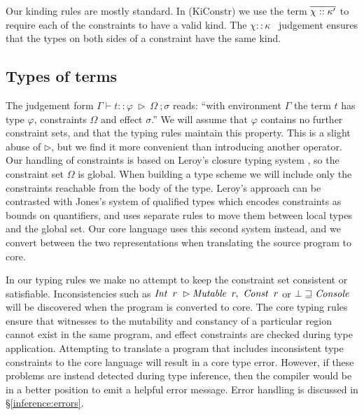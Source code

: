 \bigskip
{}

\clearpage{}
Our kinding rules are mostly standard. In (KiConstr) we use the term $\overline{\chi :: \kappa'}$ to require each of the constraints to have a valid kind. The $\chi :: \kappa$ \ judgement ensures that the types on both sides of a constraint have the same kind.


\subsection{Types of terms}
\begin{center}
\end{center}


The judgement form $\Gamma \vdash t :: \varphi \ \rhd \ \Omega \ ; \sigma$ reads: ``with environment $\Gamma$ the term $t$ has type $\varphi$, constraints $\Omega$ and effect $\sigma$.'' We will assume that $\varphi$ contains no further constraint sets, and that the typing rules maintain this property. This is a slight abuse of $\rhd$, but we find it more convenient than introducing another operator. Our handling of constraints is based on Leroy's closure typing system \cite{leroy:polymorphic-type-inference}, so the constraint set $\Omega$ is global. When building a type scheme we will include only the constraints reachable from the body of the type. Leroy's approach can be contrasted with Jones's system of qualified types \cite{jones:qualified-types} which encodes constraints as bounds on quantifiers, and uses separate rules to move them between local types and the global set. Our core language uses this second system instead, and we convert between the two representations when translating the source program to core.

In our typing rules we make no attempt to keep the constraint set consistent or satisfiable. Inconsistencies such as $\iInt \ r \ \rhd \iMutable \ r, \ \iConst \ r$ or $\bot \sqsupseteq \operatorname{\mathit{Console}}$ will be discovered when the program is converted to core. The core typing rules ensure that witnesses to the mutability and constancy of a particular region cannot exist in the same program, and effect constraints are checked during type application. Attempting to translate a program that includes inconsistent type constraints to the core language will result in a core type error. However, if these problems are instead detected during type inference, then the compiler would be in a better position to emit a helpful error message. Error handling is discussed in \S\ref{inference:errors}.

